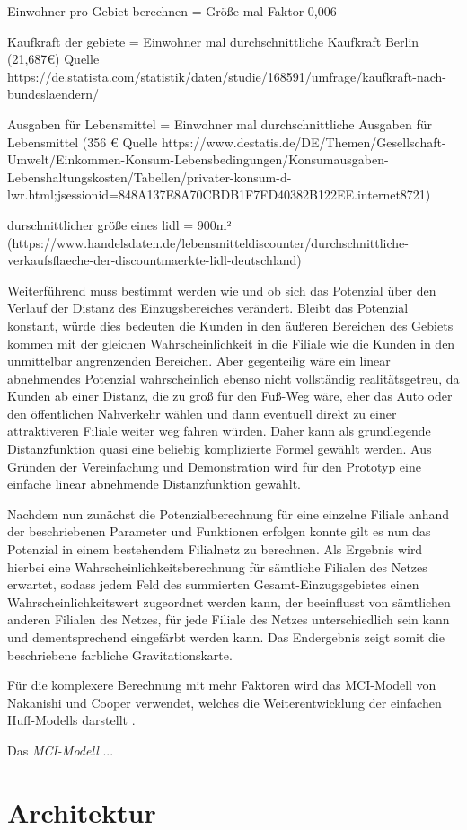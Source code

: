 Einwohner pro Gebiet berechnen = Größe mal Faktor 0,006

Kaufkraft der gebiete = Einwohner mal durchschnittliche Kaufkraft Berlin (21,687€) Quelle https://de.statista.com/statistik/daten/studie/168591/umfrage/kaufkraft-nach-bundeslaendern/

Ausgaben für Lebensmittel = Einwohner mal durchschnittliche Ausgaben für Lebensmittel (356 € Quelle https://www.destatis.de/DE/Themen/Gesellschaft-Umwelt/Einkommen-Konsum-Lebensbedingungen/Konsumausgaben-Lebenshaltungskosten/Tabellen/privater-konsum-d-lwr.html;jsessionid=848A137E8A70CBDB1F7FD40382B122EE.internet8721)

durschnittlicher größe eines lidl = 900m² (https://www.handelsdaten.de/lebensmitteldiscounter/durchschnittliche-verkaufsflaeche-der-discountmaerkte-lidl-deutschland)


Weiterführend muss bestimmt werden wie und ob sich das Potenzial über den Verlauf der Distanz des Einzugsbereiches verändert.
Bleibt das Potenzial konstant, würde dies bedeuten die Kunden in den äußeren Bereichen des Gebiets kommen mit der gleichen Wahrscheinlichkeit in die Filiale wie die Kunden in den unmittelbar angrenzenden Bereichen.
Aber gegenteilig wäre ein linear abnehmendes Potenzial wahrscheinlich ebenso nicht vollständig realitätsgetreu, da Kunden ab einer Distanz, die zu groß für den Fuß-Weg wäre, eher das Auto oder den öffentlichen Nahverkehr wählen und dann eventuell direkt zu einer attraktiveren Filiale weiter weg fahren würden. 
Daher kann als grundlegende Distanzfunktion quasi eine beliebig komplizierte Formel gewählt werden.
Aus Gründen der Vereinfachung und Demonstration wird für den Prototyp eine einfache linear abnehmende Distanzfunktion gewählt.

Nachdem nun zunächst die Potenzialberechnung für eine einzelne Filiale anhand der beschriebenen Parameter und Funktionen erfolgen konnte gilt es nun das Potenzial in einem bestehendem Filialnetz zu berechnen.
Als Ergebnis wird hierbei eine Wahrscheinlichkeitsberechnung für sämtliche Filialen des Netzes erwartet, sodass jedem Feld des summierten Gesamt-Einzugsgebietes einen Wahrscheinlichkeitswert zugeordnet werden kann, der beeinflusst von sämtlichen anderen Filialen des Netzes, für jede Filiale des Netzes unterschiedlich sein kann und dementsprechend eingefärbt werden kann.
Das Endergebnis zeigt somit die beschriebene farbliche Gravitationskarte.

Für die komplexere Berechnung mit mehr Faktoren wird das MCI-Modell von Nakanishi und Cooper verwendet, welches die Weiterentwicklung der einfachen Huff-Modells darstellt \cite{mciModell}.

Das \textit{MCI-Modell} ...
\section{Architektur}
